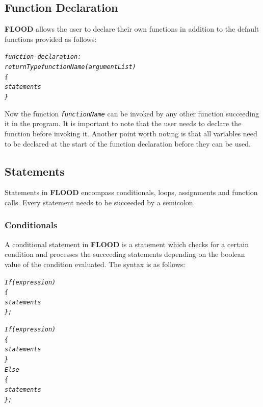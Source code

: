 \documentclass[12pt]{report}
\begin{document}
\subsection{Function Declaration}

\textbf{FLOOD} allows the user to declare their own functions in addition to the default functions provided as follows:

\begin{alltt}\begin{singlespace}
         \textit{function-declaration:}
            \textit{returnType functionName (argumentList)
            \{
                statements
            \}}\end{singlespace}
\end{alltt}

Now the function \texttt{\textit{functionName}} can be invoked by any other function succeeding it in the program. It is important to note that the user needs to declare the function before invoking it.
Another point worth noting is that all variables need to be declared at the start of the function declaration before they can be used. 

\subsection{Statements}

Statements in \textbf{FLOOD} encompass conditionals, loops, assignments and function calls. Every statement needs to be succeeded by a semicolon.

\subsubsection{Conditionals}

A conditional statement in \textbf{FLOOD} is a statement which checks for a certain condition and processes the succeeding statements depending on the boolean value of the condition evaluated. The syntax is as follows:

\begin{alltt}\begin{singlespace}
            \textit{If (expression)
            \{
                statements
            \};}

            \textit{If (expression)
            \{
                statements
            \}
            Else
            \{
                statements
            \};}\end{singlespace}
\end{alltt}
\end{document}

